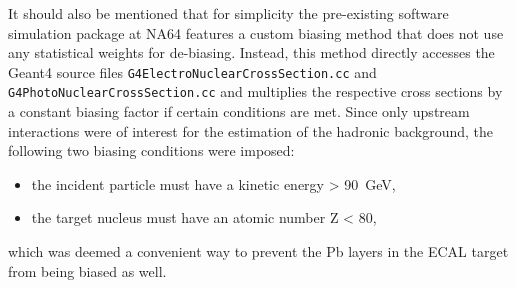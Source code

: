 It should also be mentioned that for simplicity the pre-existing software simulation package at NA64 features a custom biasing method that does not use any statistical weights for de-biasing. Instead, this method directly accesses the Geant4 source files \verb|G4ElectroNuclearCrossSection.cc| and \verb|G4PhotoNuclearCrossSection.cc| and multiplies the respective cross sections by a constant biasing factor if certain conditions are met. Since only upstream interactions were of interest for the estimation of the hadronic background, the following two biasing conditions were imposed:

\begin{itemize}
    \item the incident particle must have a kinetic energy > \SI{90}{\giga\electronvolt},
    \item the target nucleus must have an atomic number Z < 80,
\end{itemize}

\noindent which was deemed a convenient way to prevent the Pb layers in the ECAL target from being biased as well. 

